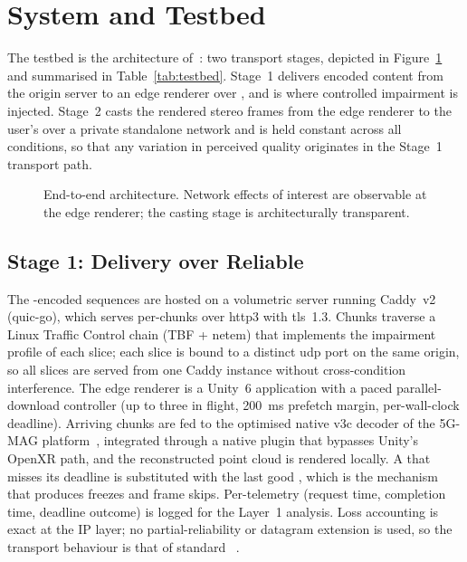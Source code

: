 \section{System and Testbed}
\label{sec:system}

The testbed is the \mosaic architecture of~\cite{mosaic2026}: two
transport stages, depicted in Figure~\ref{fig:architecture} and
summarised in Table~\ref{tab:testbed}. Stage~1 delivers encoded \vpcc
content from the origin server to an edge renderer over \quic, and is
where controlled impairment is injected. Stage~2 casts the rendered
stereo frames from the edge renderer to the user's \hmd over a private
\fiveg standalone network and is held constant across all conditions,
so that any variation in perceived quality originates in the Stage~1
transport path.

\begin{figure}[t]
  \centering
  \caption{End-to-end architecture. Network effects of interest are
  observable at the edge renderer; the casting stage is
  architecturally transparent.}
  \label{fig:architecture}
\end{figure}

\subsection{Stage 1: \vpcc Delivery over Reliable \quic}
\label{sec:sys-stage1}
The \vpcc-encoded sequences are hosted on a volumetric server running
Caddy~v2 (quic-go), which serves per-\gof chunks over \gls{http3} with
\gls{tls}~1.3. Chunks traverse a Linux Traffic Control chain (TBF + netem)
that implements the impairment profile of each slice; each slice is
bound to a distinct \gls{udp} port on the same origin, so all slices are
served from one Caddy instance without cross-condition interference.
The edge renderer is a Unity~6 application with a paced
parallel-download controller (up to three \gofs in flight,
\SI{200}{\milli\second} prefetch margin, per-\gof wall-clock
deadline). Arriving chunks are fed to the optimised native \gls{v3c} decoder
of the 5G-MAG platform~\cite{fivegmag}, integrated through a native
plugin that bypasses Unity's OpenXR path, and the reconstructed point
cloud is rendered locally. A \gof that misses its deadline is
substituted with the last good \gof, which is the mechanism that
produces freezes and frame skips. Per-\gof telemetry (request time,
completion time, deadline outcome) is logged for the Layer~1 analysis.
Loss accounting is exact at the IP layer; no partial-reliability or
datagram extension is used, so the transport behaviour is that of
standard \quic~\cite{rfc9000}.

